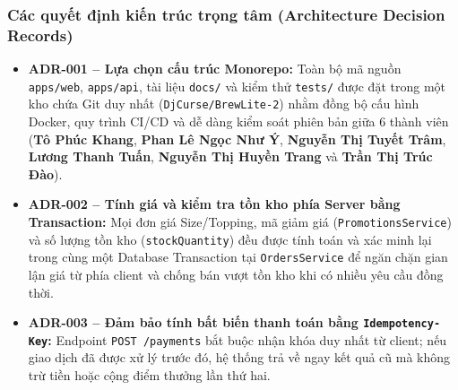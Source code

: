 \subsubsection{Các quyết định kiến trúc trọng tâm (Architecture Decision Records)}
\begin{itemize}
    \item \textbf{ADR-001 -- Lựa chọn cấu trúc Monorepo:} Toàn bộ mã nguồn \texttt{apps/web}, \texttt{apps/api}, tài liệu \texttt{docs/} và kiểm thử \texttt{tests/} được đặt trong một kho chứa Git duy nhất (\texttt{DjCurse/BrewLite-2}) nhằm đồng bộ cấu hình Docker, quy trình CI/CD và dễ dàng kiểm soát phiên bản giữa 6 thành viên (\textbf{Tô Phúc Khang}, \textbf{Phan Lê Ngọc Như Ý}, \textbf{Nguyễn Thị Tuyết Trâm}, \textbf{Lương Thanh Tuấn}, \textbf{Nguyễn Thị Huyền Trang} và \textbf{Trần Thị Trúc Đào}).
    \item \textbf{ADR-002 -- Tính giá và kiểm tra tồn kho phía Server bằng Transaction:} Mọi đơn giá Size/Topping, mã giảm giá (\texttt{PromotionsService}) và số lượng tồn kho (\texttt{stockQuantity}) đều được tính toán và xác minh lại trong cùng một Database Transaction tại \texttt{OrdersService} để ngăn chặn gian lận giá từ phía client và chống bán vượt tồn kho khi có nhiều yêu cầu đồng thời.
    \item \textbf{ADR-003 -- Đảm bảo tính bất biến thanh toán bằng \texttt{Idempotency-Key}:} Endpoint \texttt{POST /payments} bắt buộc nhận khóa duy nhất từ client; nếu giao dịch đã được xử lý trước đó, hệ thống trả về ngay kết quả cũ mà không trừ tiền hoặc cộng điểm thưởng lần thứ hai.
\end{itemize}

